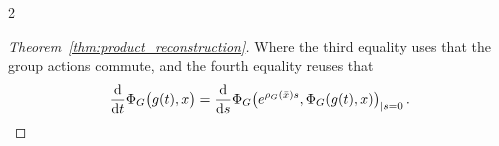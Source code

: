 \documentclass{article}
\newtheorem{proof}{Proof}[theorem]
\newcommand{\state}{x}
\newcommand{\appstate}{\bar{x}}
\begin{document}
\begin{multicols}{2}
\begin{proof}[Theorem~\ref{thm:product_reconstruction}]
    Where the third equality uses that the group actions commute, and the fourth equality reuses that 
    \begin{align}
        \frac{\textnormal{d}}{\textnormal{d}t} \Phi_G\big(g(t),\state\big) = \frac{\textnormal{d}}{\textnormal{d}s}\Phi_G\big(e^{\rho_G(\appstate)s},\Phi_G(g(t),\state)\big)_{|s=0}\,.
    \end{align}
\end{proof}


\end{multicols}
\end{document}
